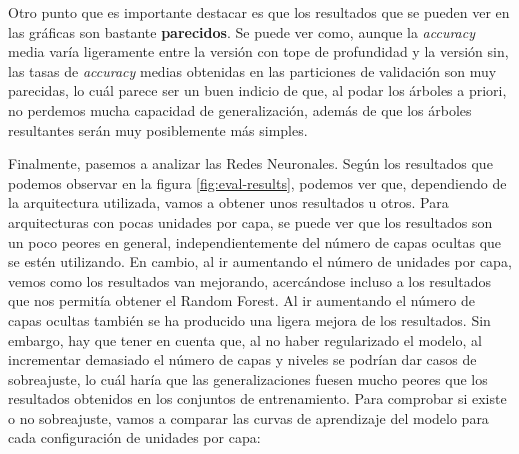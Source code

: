 \documentclass[11pt,a4paper]{article}
\begin{document}
Otro punto que es importante destacar es que los resultados que se pueden ver en las gráficas son bastante \textbf{parecidos}. Se puede ver como, aunque
la \textit{accuracy} media varía ligeramente entre la versión con tope de profundidad y la versión sin, las tasas de \textit{accuracy} medias
obtenidas en las particiones de validación son muy parecidas, lo cuál parece ser un buen indicio de que, al podar los árboles a priori, no perdemos
mucha capacidad de generalización, además de que los árboles resultantes serán muy posiblemente más simples.

Finalmente, pasemos a analizar las Redes Neuronales. Según los resultados que podemos observar en la figura \ref{fig:eval-results}, podemos ver que,
dependiendo de la arquitectura utilizada, vamos a obtener unos resultados u otros. Para arquitecturas con pocas unidades por capa, se puede ver
que los resultados son un poco peores en general, independientemente del número de capas ocultas que se estén utilizando. En cambio, al ir aumentando
el número de unidades por capa, vemos como los resultados van mejorando, acercándose incluso a los resultados que nos permitía obtener el Random
Forest. Al ir aumentando el número de capas ocultas también se ha producido una ligera mejora de los resultados. Sin embargo, hay que tener en
cuenta que, al no haber regularizado el modelo, al incrementar demasiado el número de capas y niveles se podrían dar casos de sobreajuste, lo
cuál haría que las generalizaciones fuesen mucho peores que los resultados obtenidos en los conjuntos de entrenamiento. Para comprobar si existe
o no sobreajuste, vamos a comparar las curvas de aprendizaje del modelo para cada configuración de unidades por capa:
\end{document}
